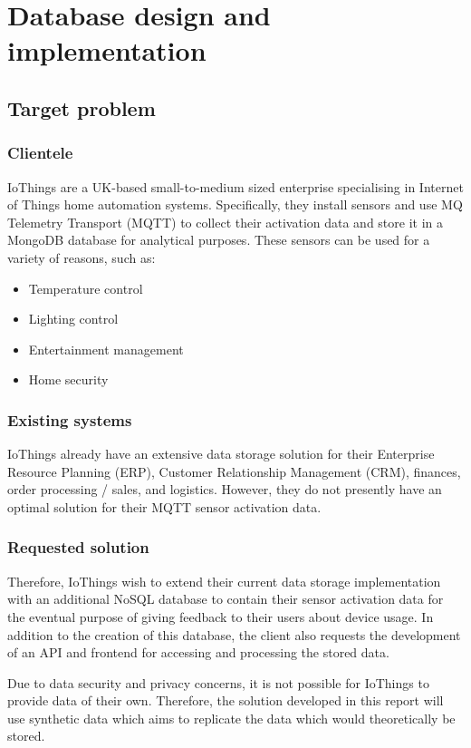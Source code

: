 \chapter{Database design and implementation}


\section{Target problem}
\subsection{Clientele}
IoThings are a UK-based small-to-medium sized enterprise specialising in Internet of Things home automation systems.
Specifically, they install sensors and use MQ Telemetry Transport (MQTT) to collect their activation data and store it in 
a MongoDB database for analytical purposes. These sensors can be used for a variety of reasons, such as:

\begin{itemize}
    \item Temperature control
    \item Lighting control 
    \item Entertainment management 
    \item Home security
\end{itemize}

\subsection{Existing systems}
IoThings already have an extensive data storage solution for their Enterprise Resource Planning (ERP), Customer Relationship 
Management (CRM), finances, order processing / sales, and logistics. However, they do not presently have an optimal solution for 
their MQTT sensor activation data.  


\subsection{Requested solution}
Therefore, IoThings wish to extend their current data storage implementation with an additional NoSQL database to contain their 
sensor activation data for the eventual purpose of giving feedback to their users about device usage. In addition to the 
creation of this database, the client also requests the development of an API and frontend for accessing and processing the 
stored data.

\para Due to data security and privacy concerns, it is not possible for IoThings to provide data of their own. Therefore, 
the solution developed in this report will use synthetic data which aims to replicate the data which would theoretically 
be stored.